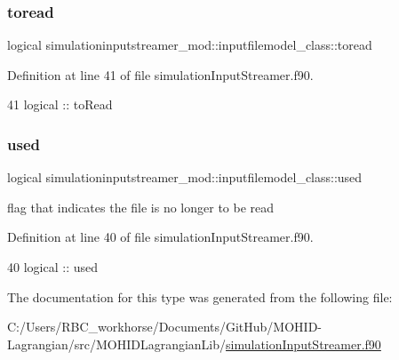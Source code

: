 \subsubsection{\texorpdfstring{toread}{toread}}
{\footnotesize\ttfamily logical simulationinputstreamer\+\_\+mod\+::inputfilemodel\+\_\+class\+::toread\hspace{0.3cm}{\ttfamily [private]}}



Definition at line 41 of file simulation\+Input\+Streamer.\+f90.


\begin{DoxyCode}
41         \textcolor{keywordtype}{logical} :: toRead
\end{DoxyCode}
\mbox{\label{structsimulationinputstreamer__mod_1_1inputfilemodel__class_a003333db579141a5b52c141b591cc86b}} 
\subsubsection{\texorpdfstring{used}{used}}
{\footnotesize\ttfamily logical simulationinputstreamer\+\_\+mod\+::inputfilemodel\+\_\+class\+::used\hspace{0.3cm}{\ttfamily [private]}}



flag that indicates the file is no longer to be read 



Definition at line 40 of file simulation\+Input\+Streamer.\+f90.


\begin{DoxyCode}
40         \textcolor{keywordtype}{logical} :: used
\end{DoxyCode}


The documentation for this type was generated from the following file\+:\begin{DoxyCompactItemize}
\item 
C\+:/\+Users/\+R\+B\+C\+\_\+workhorse/\+Documents/\+Git\+Hub/\+M\+O\+H\+I\+D-\/\+Lagrangian/src/\+M\+O\+H\+I\+D\+Lagrangian\+Lib/\mbox{\hyperlink{simulation_input_streamer_8f90}{simulation\+Input\+Streamer.\+f90}}\end{DoxyCompactItemize}
